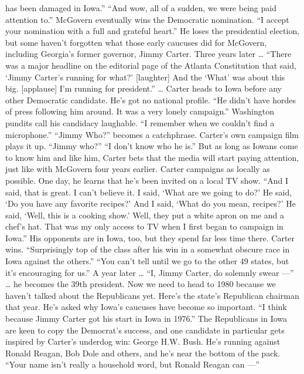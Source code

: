 \begin{itemize}
  has been damaged in Iowa.'' ``And wow, all of a sudden, we were being
  paid attention to.'' McGovern eventually wins the Democratic
  nomination. ``I accept your nomination with a full and grateful
  heart.'' He loses the presidential election, but some haven't
  forgotten what those early caucuses did for McGovern, including
  Georgia's former governor, Jimmy Carter. Three years later \ldots{}
  ``There was a major headline on the editorial page of the Atlanta
  Constitution that said, `Jimmy Carter's running for what?'
  {[}laughter{]} And the `What' was about this big. {[}applause{]} I'm
  running for president.'' \ldots{} Carter heads to Iowa before any
  other Democratic candidate. He's got no national profile. ``He didn't
  have hordes of press following him around. It was a very lonely
  campaign.'' Washington pundits call his candidacy laughable. ``I
  remember when we couldn't find a microphone.'' ``Jimmy Who?'' becomes
  a catchphrase. Carter's own campaign film plays it up. ``Jimmy who?''
  ``I don't know who he is.'' But as long as Iowans come to know him and
  like him, Carter bets that the media will start paying attention, just
  like with McGovern four years earlier. Carter campaigns as locally as
  possible. One day, he learns that he's been invited on a local TV
  show. ``And I said, that is great. I can't believe it. I said, `What
  are we going to do?' He said, `Do you have any favorite recipes?' And
  I said, `What do you mean, recipes?' He said, `Well, this is a cooking
  show.' Well, they put a white apron on me and a chef's hat. That was
  my only access to TV when I first began to campaign in Iowa.'' His
  opponents are in Iowa, too, but they spend far less time there. Carter
  wins. ``Surprisingly top of the class after his win in a somewhat
  obscure race in Iowa against the others.'' ``You can't tell until we
  go to the other 49 states, but it's encouraging for us.'' A year later
  \ldots{} ``I, Jimmy Carter, do solemnly swear ---'' \ldots{} he
  becomes the 39th president. Now we need to head to 1980 because we
  haven't talked about the Republicans yet. Here's the state's
  Republican chairman that year. He's asked why Iowa's caucuses have
  become so important. ``I think because Jimmy Carter got his start in
  Iowa in 1976.'' The Republicans in Iowa are keen to copy the
  Democrat's success, and one candidate in particular gets inspired by
  Carter's underdog win: George H.W. Bush. He's running against Ronald
  Reagan, Bob Dole and others, and he's near the bottom of the pack.
  ``Your name isn't really a household word, but Ronald Reagan can ---''

\end{itemize}
